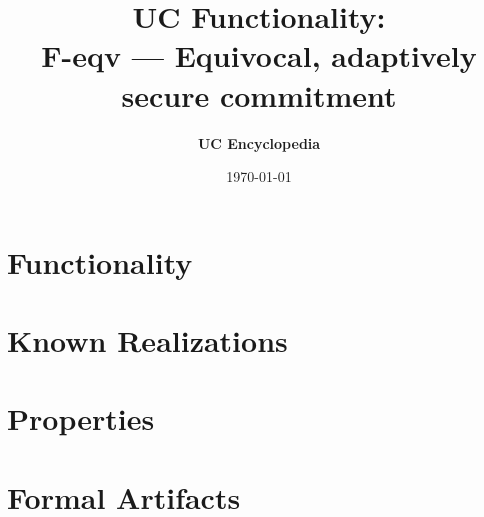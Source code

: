 \documentclass[11pt,a4paper]{article}
\title{\textbf{\Large UC Functionality:}\\[0.2em] \Large F-eqv --- Equivocal, adaptively secure commitment}
\author{\textbf{UC Encyclopedia}}
\date{\today}
\newtheorem{functionality}{Functionality}
\begin{document}
\maketitle

\begin{abstract}
\end{abstract}

\section{Functionality}

%

\section{Known Realizations}


\section{Properties}


\section{Formal Artifacts}

\end{document}
